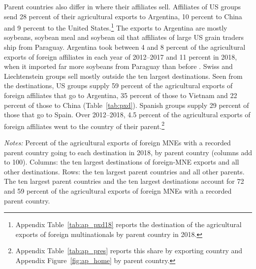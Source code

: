 Parent countries also differ in where their affiliates sell. Affiliates of US groups send 28 percent of their
agricultural exports to Argentina, 10 percent to China and 9 percent to the United States.\footnote{Appendix Table~\ref{tab:ap_pxd18} reports the destination of the agricultural exports of foreign multinationals by parent country in 2018.} The exports to Argentina
are mostly soybeans, soybean meal and soybean oil that affiliates of large US grain traders ship from Paraguay.
Argentina took between 4 and 8 percent of the agricultural exports of foreign affiliates in each year of 2012--2017
and 11 percent in 2018, when it imported far more soybeans from Paraguay than before \citep{trase2020}. Swiss and
Liechtenstein groups sell mostly outside the ten largest destinations. Seen from the destinations, US groups supply 59 percent of the agricultural exports of foreign
affiliates that go to Argentina, 35 percent of those to Vietnam and 22 percent of those to China (Table~\ref{tab:pxd}).
Spanish groups supply 29 percent of those that go to Spain. Over 2012--2018, 4.5 percent of the agricultural exports of foreign affiliates went to the country of their parent.\footnote{Appendix Table~\ref{tab:ap_pres} reports this share by exporting country and Appendix Figure~\ref{fig:ap_home} by parent country.}

\begin{table}[htbp]
\centering
\caption{Foreign-multinational agricultural exports: top 10 destinations and top 10 parents, 2018}
\label{tab:pxd}
{\footnotesize\setlength{\tabcolsep}{3pt}\setlength{\extrarowheight}{1pt}
}

\begin{minipage}{0.95\linewidth}
\notesize
\vspace{0.6em}
\textit{Notes:} Percent of the agricultural exports of foreign MNEs with a recorded parent country going to each destination in 2018, by parent country (columns add to 100). Columns: the ten largest destinations of foreign-MNE exports and all other destinations. Rows: the ten largest parent countries and all other parents. The ten largest parent countries and the ten largest destinations account for 72 and 59 percent of the agricultural exports of foreign MNEs with a recorded parent country.\\
\srcnote
\end{minipage}
\end{table}

